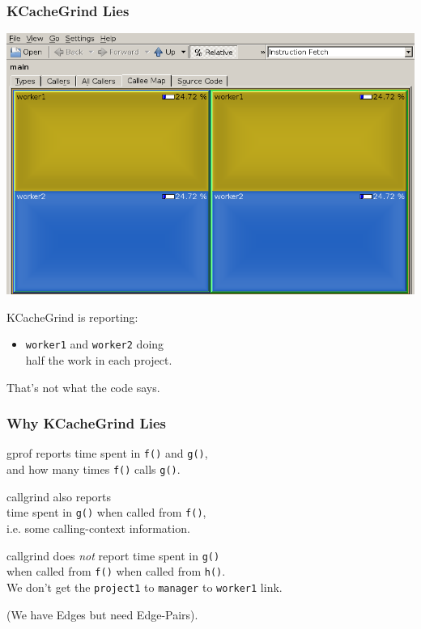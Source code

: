 \documentclass[aspectratio=43]{beamer}
\newenvironment{changemargin}[1]{%
  \begin{list}{}{%
    \setlength{\topsep}{0pt}%
    \setlength{\leftmargin}{#1}%
    \setlength{\rightmargin}{1em}
    \setlength{\listparindent}{\parindent}%
    \setlength{\itemindent}{\parindent}%
    \setlength{\parsep}{\parskip}%
  }%
  \item[]}{\end{list}}
\begin{document}
\begin{frame}
  \frametitle{KCacheGrind Lies}
  \begin{center}
    \includegraphics[width=.5\textwidth]{L27/kcachegrind2-top}
  \end{center}
  \begin{changemargin}{2cm}
    KCacheGrind is reporting:
    \begin{itemize}
    \item {\tt worker1} and {\tt worker2} doing \\
      half the work in each project.
    \end{itemize}
    That's not what the code says.
  \end{changemargin}
\end{frame}

\begin{frame}
  \frametitle{Why KCacheGrind Lies}

  \begin{changemargin}{2cm}
  \item gprof reports time spent in {\tt f()} and {\tt g()},\\
    and how many times {\tt f()} calls {\tt g()}.
  \item callgrind also reports \\
     time spent  in {\tt g()}
     when called from {\tt f()}, \\
     i.e. some calling-context information.\\[1em]
   \item callgrind does \emph{not} report time spent in {\tt g()} \\
     when
     called from {\tt f()} when called from {\tt h()}.\\[1em]
     We don't get the {\tt project1} to {\tt manager} to {\tt worker1} link.\\[1em]
     \item (We have Edges but need Edge-Pairs).
  \end{changemargin}
\end{frame}
\end{document}
